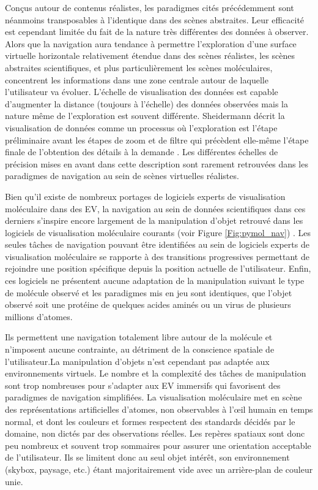
Conçus autour de contenus réalistes, les paradigmes cités précédemment sont néanmoins transposables à l'identique dans des scènes abstraites. Leur efficacité est cependant limitée du fait de la nature très différentes des données à observer. Alors que la navigation aura tendance à permettre l'exploration d'une surface virtuelle horizontale relativement étendue dans des scènes réalistes, les scènes abstraites scientifiques, et plus particulièrement les scènes moléculaires, concentrent les informations dans une zone centrale autour de laquelle l'utilisateur va évoluer. L'échelle de visualisation des données est capable d'augmenter la distance (toujours à l'échelle) des données observées mais la nature même de l'exploration est souvent différente. Sheidermann décrit la visualisation de données comme un processus où l'exploration est l'étape préliminaire avant les étapes de zoom et de filtre qui précèdent elle-même l'étape finale de l'obtention des détails à la demande \cite{shneiderman_eyes_1996}. Les différentes échelles de précision mises en avant dans cette description sont rarement retrouvées dans les paradigmes de navigation au sein de scènes virtuelles réalistes.

Bien qu'il existe de nombreux portages de logiciels experts de visualisation moléculaire dans des EV, la navigation au sein de données scientifiques dans ces derniers s’inspire encore largement de la manipulation d'objet retrouvé dans les logiciels de visualisation moléculaire courants (voir Figure \ref{Fig:pymol_nav}) \cite{frohlich1999exploring}. Les seules tâches de navigation pouvant être identifiées au sein de logiciels experts de visualisation moléculaire se rapporte à des transitions progressives permettant de rejoindre une position spécifique depuis la position actuelle de l'utilisateur. Enfin, ces logiciels ne présentent aucune adaptation de la manipulation suivant le type de molécule observé et les paradigmes mis en jeu sont identiques, que l'objet observé soit une protéine de quelques acides aminés ou un virus de plusieurs millions d'atomes.

Ils permettent une navigation totalement libre autour de la molécule et n'imposent aucune contrainte, au détriment de la conscience spatiale de l'utilisateur.La manipulation d'objets n'est cependant pas adaptée aux environnements virtuels. Le nombre et la complexité des tâches de manipulation sont trop nombreuses pour s'adapter aux EV immersifs qui favorisent des paradigmes de navigation simplifiées. La visualisation moléculaire met en scène des représentations artificielles d'atomes, non observables à l’œil humain en temps normal, et dont les couleurs et formes respectent des standards décidés par le domaine, non dictés par des observations réelles. Les repères spatiaux sont donc peu nombreux et souvent trop sommaires pour assurer une orientation acceptable de l'utilisateur. Ils se limitent donc au seul objet intérêt, son environnement (skybox, paysage, etc.) étant majoritairement vide avec un arrière-plan de couleur unie.   
 

